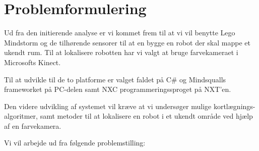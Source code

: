 \section{Problemformulering}

Ud fra den initierende analyse er vi kommet frem til at vi vil benytte Lego Mindstorm og de tilhørende sensorer til at en bygge en robot der skal mappe et ukendt rum.
Til at lokalisere robotten har vi valgt at bruge farvekameraet i Microsofts Kinect.

Til at udvikle til de to platforme er valget faldet på C\# og Mindsqualls frameworket på PC-delen samt NXC programmeringssproget på NXT'en.

Den videre udvikling af systemet vil kræve at vi undersøger mulige kortlægnings-algoritmer, samt metoder til at lokalisere en robot i et ukendt område ved hjælp af en farvekamera.

Vi vil arbejde ud fra følgende problemstilling:

\begin{samepage}


\end{samepage}